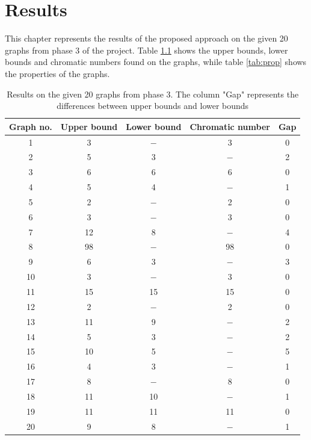 \documentclass[a4paper]{report}
\begin{document}
	\chapter{Results}
	This chapter represents the results of the proposed approach on the given 20 graphs from phase 3 of the project. Table \ref{tab:result} shows the upper bounds, lower bounds and chromatic numbers found on the graphs, while table \ref{tab:prop} shows the properties of the graphs.
		\begin{table} [h!]
			\caption{Results on the given 20 graphs from phase 3. The column "Gap" represents the differences between upper bounds and lower bounds}
		\begin{center}
			\begin{tabular}{| c | c | c | c |c|}
				\hline
				Graph no. & Upper bound & Lower bound & Chromatic number & Gap \\
				\hline
				1 & 3 & $-$ & 3 & 0\\
				\hline
				2 & 5 & 3 & $-$ & 2\\
				\hline
				3 & 6 & 6 & 6 & 0\\
				\hline
				4 & 5 & 4 & $-$ & 1\\
				\hline
				5 & 2 & $-$ & 2 & 0\\
				\hline
				6 & 3 & $-$ & 3 & 0\\
				\hline
				7 & 12 & 8 & $-$ & 4\\
				\hline
				8 & 98 & $-$ & 98 & 0\\
				\hline
				9 & 6 & 3 & $-$ & 3\\
				\hline
				10 & 3 & $-$ & 3 & 0\\
				\hline
				11 & 15 & 15 & 15 & 0\\
				\hline
				12 & 2 & $-$ & 2 & 0\\
				\hline
				13 & 11 & 9 & $-$ & 2\\
				\hline
				14 & 5 & 3 & $-$ & 2\\
				\hline
				15 & 10 & 5 & $-$ & 5\\
				\hline
				16 & 4 & 3 & $-$ & 1\\
				\hline
				17 & 8 & $-$ & 8 & 0\\
				\hline
				18 & 11 & 10 & $-$ & 1\\
				\hline
				19 & 11 & 11 & 11 & 0\\
				\hline
				20 & 9 & 8 & $-$ & 1\\
				\hline
			\end{tabular}
		\end{center}
		\label{tab:result}
	\end{table}
	
\end{document}
